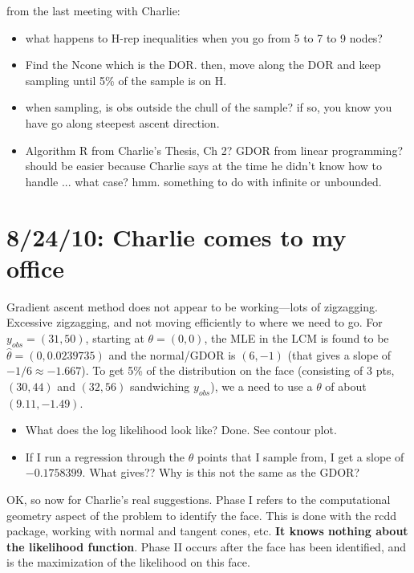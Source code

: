 \documentclass{amsbook}
\theoremstyle{definition}
\theoremstyle{remark}
\begin{document}
from the last meeting with Charlie:
\begin{itemize}
\item what happens to H-rep inequalities when you go from 5 to 7 to 9 nodes?
\item Find the Ncone which is the DOR.  then, move along the DOR and keep sampling until 5\% of the sample is on H.
\item when sampling, is obs outside the chull of the sample?  if so, you know you have go along steepest ascent direction.
\item Algorithm R from Charlie's Thesis, Ch 2?  GDOR from linear programming?  should be easier because Charlie says at the time he didn't know how to handle ... what case?  hmm.  something to do with infinite or unbounded.
\end{itemize}

\section{8/24/10: Charlie comes to my office}
Gradient ascent method does not appear to be working---lots of zigzagging.  Excessive zigzagging, and not moving efficiently to where we need to go.  For $y_{obs} = (31,50)$, starting at $\theta = (0,0)$, the MLE in the LCM is found to be $\hat{\theta} = (0, 0.0239735)$ and the normal/GDOR is $(6, -1)$ (that gives a slope of $-1/6 \approx -1.667$).  To get 5\% of the distribution on the face (consisting of 3 pts, $(30,44)$ and $(32,56)$ sandwiching $y_{obs}$), we a need to use a $\theta$ of about $(9.11, -1.49)$.

\begin{itemize}
\item What does the log likelihood look like?  Done.  See contour plot.
\item If I run a regression through the $\theta$ points that I sample from, I get a slope of $-0.1758399$.  What gives??  Why is this not the same as the GDOR?
\end{itemize}

OK, so now for Charlie's real suggestions.  Phase I refers to the computational geometry aspect of the problem to identify the face.  This is done with the rcdd package, working with normal and tangent cones, etc.  \textbf{It knows nothing about the likelihood function}.  Phase II occurs after the face has been identified, and is the maximization of the likelihood on this face.
\end{document}
